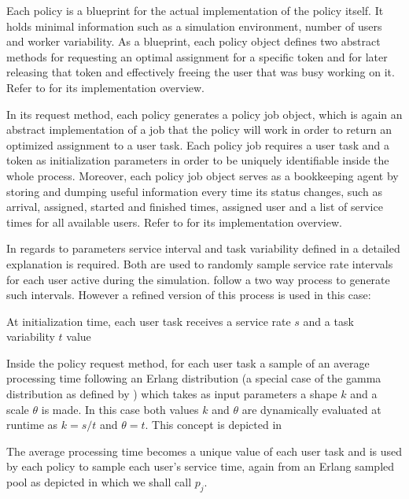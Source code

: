 Each policy is a blueprint for the actual implementation of the policy itself. It holds minimal information such as a simulation environment, number of users and worker variability. As a blueprint, each policy object defines two abstract methods for requesting an optimal assignment for a specific token and for later releasing that token and effectively freeing the user that was busy working on it. Refer to  for its implementation overview.


In its request method, each policy generates a policy job object, which is again an abstract implementation of a job that the policy will work in order to return an optimized assignment to a user task. Each policy job requires a user task and a token as initialization parameters in order to be uniquely identifiable inside the whole process. Moreover, each policy job object serves as a bookkeeping agent by storing and dumping useful information every time its status changes, such as arrival, assigned, started and finished times, assigned user and a list of service times for all available users. Refer to  for its implementation overview.


In regards to parameters service interval and task variability defined in  a detailed explanation is required. Both are used to randomly sample service rate intervals for each user active during the simulation. \citet[p. 8]{Zeng2005} follow a two way process to generate such intervals. However a refined version of this process is used in this case:
\begin{enumerate*}
	\item At initialization time, each user task receives a service rate $s$ and a task variability $t$ value
	\item Inside the policy request method, for each user task a sample of an average processing time following an Erlang distribution (a special case of the gamma distribution as defined by \citet{Adan2015}) which takes as input parameters a shape $k$ and a scale $\theta$ is made. In this case both values $k$ and $\theta$ are dynamically evaluated at runtime as $k=s/t$ and $\theta = t$. This concept is depicted in 
	\item The average processing time becomes a unique value of each user task and is used by each policy to sample each user's service time, again from an Erlang sampled pool as depicted in  which we shall call $p_j$.
\end{enumerate*}


